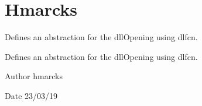 \hypertarget{group__hmarcks}{}\section{Hmarcks}
\label{group__hmarcks}


Defines an abstraction for the dll\+Opening using dlfcn.  


Defines an abstraction for the dll\+Opening using dlfcn. 

\begin{DoxyAuthor}{Author}
hmarcks
\end{DoxyAuthor}
\begin{DoxyDate}{Date}
23/03/19 
\end{DoxyDate}
